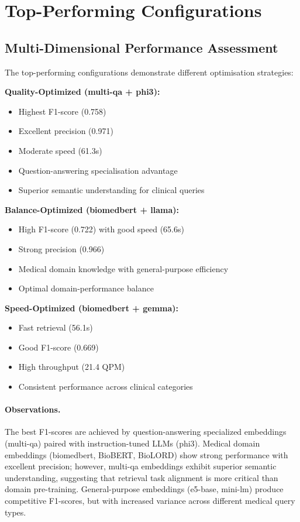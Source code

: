 \section{Top-Performing Configurations}



\subsection{Multi-Dimensional Performance Assessment}

The top-performing configurations demonstrate different optimisation strategies:

\textbf{Quality-Optimized (multi-qa + phi3):}
\begin{itemize}
    \item Highest F1-score (0.758)
    \item Excellent precision (0.971)
    \item Moderate speed (61.3s)
    \item Question-answering specialisation advantage
    \item Superior semantic understanding for clinical queries
\end{itemize}

\textbf{Balance-Optimized (biomedbert + llama):}
\begin{itemize}
    \item High F1-score (0.722) with good speed (65.6s)
    \item Strong precision (0.966)
    \item Medical domain knowledge with general-purpose efficiency
    \item Optimal domain-performance balance
\end{itemize}

\textbf{Speed-Optimized (biomedbert + gemma):}
\begin{itemize}
    \item Fast retrieval (56.1s)
    \item Good F1-score (0.669)
    \item High throughput (21.4 QPM)
    \item Consistent performance across clinical categories
\end{itemize}

\paragraph{Observations.} The best F1-scores are achieved by question-answering specialized embeddings (multi-qa) paired with instruction-tuned LLMs (phi3). Medical domain embeddings (biomedbert, BioBERT, BioLORD) show strong performance with excellent precision; however, multi-qa embeddings exhibit superior semantic understanding, suggesting that retrieval task alignment is more critical than domain pre-training. General-purpose embeddings (e5-base, mini-lm) produce competitive F1-scores, but with increased variance across different medical query types.

